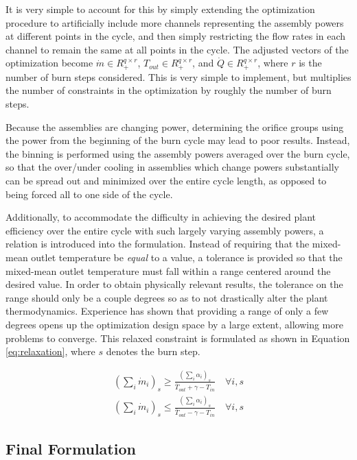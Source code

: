 \documentclass[11pt, oneside]{article}   	%
\begin{document}
It is very simple to account for this by simply extending the optimization procedure to artificially include more channels representing the assembly powers at different points in the cycle, and then simply restricting the flow rates in each channel to remain the same at all points in the cycle.
The adjusted vectors of the optimization become $\dot{m} \in R^{q \times r}_+$, $T_{out} \in R^{q \times r}_+$, and $\dot{Q} \in R^{q \times r}_+$, where $r$ is the number of burn steps considered.
This is very simple to implement, but multiplies the number of constraints in the optimization by roughly the number of burn steps.

Because the assemblies are changing power, determining the orifice groups using the power from the beginning of the burn cycle may lead to poor results.
Instead, the binning is performed using the assembly powers averaged over the burn cycle, so that the over/under cooling in assemblies which change powers substantially can be spread out and minimized over the entire cycle length, as opposed to being forced all to one side of the cycle.

Additionally, to accommodate the difficulty in achieving the desired plant efficiency over the entire cycle with such largely varying assembly powers, a relation is introduced into the formulation.
Instead of requiring that the mixed-mean outlet temperature be \textit{equal} to a value, a tolerance is provided so that the mixed-mean outlet temperature must fall within a range centered around the desired value.
In order to obtain physically relevant results, the tolerance on the range should only be a couple degrees so as to not drastically alter the plant thermodynamics.
Experience has shown that providing a range of only a few degrees opens up the optimization design space by a large extent, allowing more problems to converge.
This relaxed constraint is formulated as shown in Equation \ref{eq:relaxation}, where $s$ denotes the burn step.

\begin{align}
(\sum_i \dot{m}_i)_s \geq \frac{(\sum_i \alpha_i)_s}{\bar{T}_{out} + \gamma - T_{in}} \label{eq:relaxation} \quad \forall i,s \\
(\sum_i \dot{m}_i)_s \leq \frac{(\sum_i \alpha_i)_s}{\bar{T}_{out} - \gamma - T_{in}} \nonumber \quad \forall i,s
\end{align}

\subsection{Final Formulation}
\end{document}
